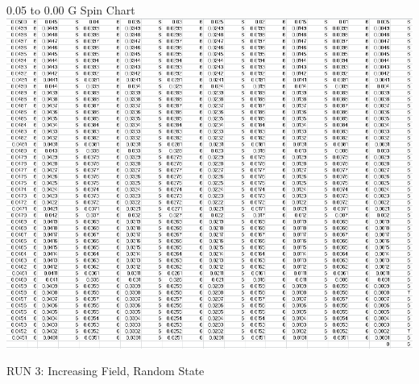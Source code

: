 \documentclass{article}
\begin{document}
\begin{center}
\LARGE 0.05 to 0.00 G Spin Chart
 \includegraphics[keepaspectratio,scale=0.7]{005to000SpinChart.png}
\end{center}
\pagebreak

\thispagestyle{plain}
\begin{center}
\LARGE
RUN 3: Increasing Field, Random State
\end{center}
\end{document}
